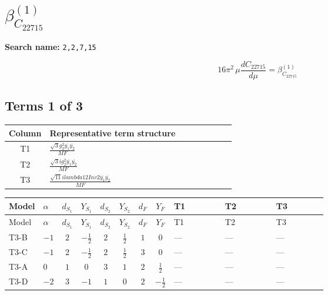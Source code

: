 \documentclass[8pt]{article}
\begin{document}
\begin{landscape}
\begin{longtable}{@{}llcccccc >{\raggedright\arraybackslash}p{0.21\linewidth} >{\raggedright\arraybackslash}p{0.21\linewidth} >{\raggedright\arraybackslash}p{0.21\linewidth}@{}}
\midrule
\bottomrule
\end{longtable}
\clearpage
\section*{$\beta_{C_{22715}}^{(1)}$}
\noindent\textbf{Search name: }\texttt{2,2,7,15}\par\smallskip
\[16\pi^2\,\mu\frac{d C_{22715}}{d\mu}=\beta_{C_{22715}}^{(1)}\]
\subsection*{Terms 1 of 3}
\begin{center}
\begin{tabular}{@{}c >{\raggedright\arraybackslash}p{0.82\linewidth}@{}}
\toprule
Column & Representative term structure \\
\midrule
T1 & \(\displaystyle \frac{\sqrt{3} g_{2}^{2} \overline{y_{1}} \overline{y_{2}}}{MF}\) \\
\midrule
T2 & \(\displaystyle \frac{\sqrt{3} i g_{2}^{2} \overline{y_{1}} \overline{y_{2}}}{MF}\) \\
\midrule
T3 & \(\displaystyle \frac{\sqrt{11} i lambda12Inv2 \overline{y_{1}} \overline{y_{2}}}{MF}\) \\
\midrule
\bottomrule
\end{tabular}
\end{center}
\smallskip
\tiny
\begin{longtable}{@{}llcccccc >{\raggedright\arraybackslash}p{0.21\linewidth} >{\raggedright\arraybackslash}p{0.21\linewidth} >{\raggedright\arraybackslash}p{0.21\linewidth}@{}}
\toprule
Model & $\alpha$ & $d_{S_1}$ & $Y_{S_1}$ & $d_{S_2}$ & $Y_{S_2}$ & $d_F$ & $Y_F$ & T1 & T2 & T3 \\
\midrule
\endfirsthead
\toprule
Model & $\alpha$ & $d_{S_1}$ & $Y_{S_1}$ & $d_{S_2}$ & $Y_{S_2}$ & $d_F$ & $Y_F$ & T1 & T2 & T3 \\
\midrule
\endhead
T3-B & $-1$ & $2$ & $-\frac{1}{2}$ & $2$ & $\frac{1}{2}$ & $1$ & $0$ & --- & --- & --- \\
\midrule
T3-C & $-1$ & $2$ & $-\frac{1}{2}$ & $2$ & $\frac{1}{2}$ & $3$ & $0$ & --- & --- & --- \\
\midrule
T3-A & $0$ & $1$ & $0$ & $3$ & $1$ & $2$ & $\frac{1}{2}$ & --- & --- & --- \\
\midrule
T3-D & $-2$ & $3$ & $-1$ & $1$ & $0$ & $2$ & $-\frac{1}{2}$ & --- & --- & --- \\
\midrule

\end{longtable}
\end{landscape}
\end{document}
